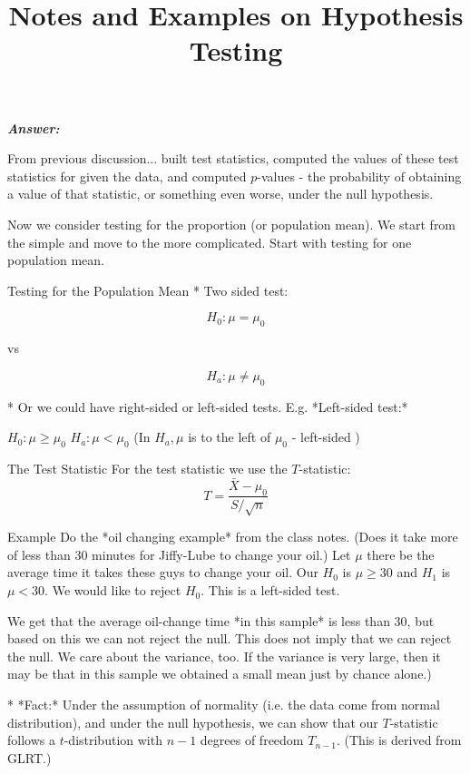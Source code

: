 \documentclass[12pt]{article}
\begin{document}
 \renewcommand{\arraystretch}{1.3}
 \renewcommand{\thefootnote}{\fnsymbol{footnote}}	
 
\title{Notes and Examples on Hypothesis Testing}%

 
\maketitle


   \textbf{\color{TealBlue}\emph{Answer:} }

From previous discussion... built test statistics, computed the values of these test statistics for given the data, and computed $p$-values - the probability of obtaining a value of that statistic, or something even worse,
under the null hypothesis.

Now we consider testing for the proportion (or population mean). We start from the
simple and move to the more complicated. Start with testing for one population mean. 

 Testing for the Population Mean    
* Two sided test:  
 
$$
H_0: \mu = \mu_0
$$  
\begin{center} vs \end{center}  
$$
H_a: \mu \neq \mu_0
$$   
 
* Or we could have right-sided or left-sided tests. 
 E.g. *Left-sided test:*  
 
 $H_0: \mu \geq \mu_0$    
 $H_a: \mu < \mu_0$     (In $H_a, \mu$ is to the left of $\mu_0$ - left-sided )   
 
The Test Statistic 
For the test statistic we use the $T$-statistic:
$$
T = \frac{\bar X - \mu_0}{ S / \sqrt n}
$$

Example 
Do the *oil changing example* from the class notes. (Does it take more of less than 30 minutes for Jiffy-Lube to change your oil.) Let $\mu$ there be the average time it takes these guys to change your oil. Our $H_0$ is $\mu \geq 30$ and $H_1$ is $\mu < 30$. We would like to reject $H_0$. This is a left-sided test. 

We get that the average oil-change time *in this sample* is less than 30, but based on this we can not reject the null. This does not imply that we can reject the null. We care about the variance, too. If the variance is very large, then it may be that in this sample we obtained a small mean just by chance alone.) 

* *Fact:* Under the assumption of normality (i.e. the data come from normal distribution), and under the null hypothesis, we can show that our $T$-statistic follows a $t$-distribution with $n-1$ degrees of freedom $T_{n-1}$. (This is derived from GLRT.)
\end{document}
